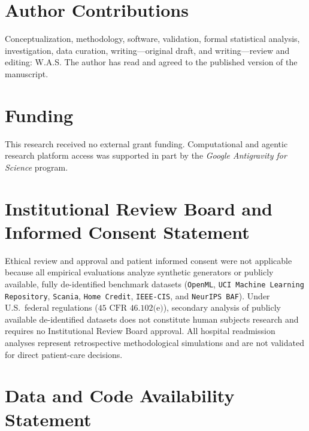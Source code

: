 \documentclass[11pt]{article}
\theoremstyle{remark}
\begin{document}
\section*{Author Contributions}

Conceptualization, methodology, software, validation, formal statistical analysis, investigation, data curation, writing---original draft, and writing---review and editing: W.A.S. The author has read and agreed to the published version of the manuscript.

\section*{Funding}

This research received no external grant funding. Computational and agentic research platform access was supported in part by the \emph{Google Antigravity for Science} program.

\section*{Institutional Review Board and Informed Consent Statement}

Ethical review and approval and patient informed consent were not applicable because all empirical evaluations analyze synthetic generators or publicly available, fully de-identified benchmark datasets (\texttt{OpenML}, \texttt{UCI Machine Learning Repository}, \texttt{Scania}, \texttt{Home Credit}, \texttt{IEEE-CIS}, and \texttt{NeurIPS BAF}). Under U.S.\ federal regulations ($45\text{ CFR }46.102\text{(e)}$), secondary analysis of publicly available de-identified datasets does not constitute human subjects research and requires no Institutional Review Board approval. All hospital readmission analyses represent retrospective methodological simulations and are not validated for direct patient-care decisions.

\section*{Data and Code Availability Statement}
\end{document}
